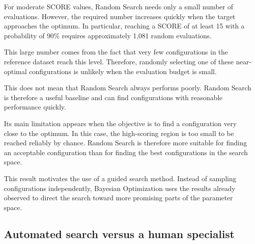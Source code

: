 For moderate SCORE values, Random Search needs only a small number of
evaluations. However, the required number increases quickly when the
target approaches the optimum. In particular, reaching a SCORE of at least 15 with a probability of 90\% requires
approximately 1,081 random evaluations. 

This large number comes from the fact that very few configurations in the
reference dataset reach this level. Therefore, randomly selecting one of
these near-optimal configurations is unlikely when the evaluation budget
is small.

This does not mean that Random Search always performs poorly.  Random Search is therefore a useful baseline and
can find configurations with reasonable performance quickly.

Its main limitation appears when the objective is to find a configuration
very close to the optimum. In this case, the high-scoring region is too
small to be reached reliably by chance. Random Search is therefore more
suitable for finding an acceptable configuration than for finding the
best configurations in the search space.

This result motivates the use of a guided search method. Instead of
sampling configurations independently, Bayesian Optimization uses the
results already observed to direct the search toward more promising parts
of the parameter space.


\subsection{Automated search versus a human specialist}

